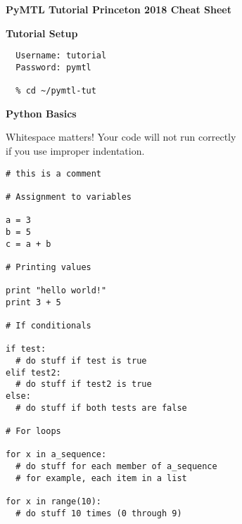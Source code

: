 \documentclass{cbxdoc}
\begin{document}
\pagestyle{empty}

\begin{landscape}
\small

\begin{center}
  \textbf{\Large PyMTL
    Tutorial  \hspace{0.5em}\textbullet\hspace{0.5em}
    Princeton 2018 \hspace{0.5em}\textbullet\hspace{0.5em}
    Cheat Sheet}
\end{center}

\begin{minipage}[t]{3.25in}
\vspace{0pt}

\colorbox{gray!30!white}{\parbox{1.025\tw}{\rule[-0.4em]{0pt}{1.4em}\centering\textbf{%
  Tutorial Setup%
}}}

\smallskip\smallskip
\begin{verbatim}
  Username: tutorial
  Password: pymtl

  % cd ~/pymtl-tut
\end{verbatim}

\vspace{0.15in}
\colorbox{gray!30!white}{\parbox{1.025\tw}{\rule[-0.4em]{0pt}{1.4em}\centering\textbf{%
  Python Basics%
}}}

\begin{center}
Whitespace matters! Your code will not run correctly \\ if you use
improper indentation.
\end{center}

\vspace{-0.1in}
\begin{lstlisting}
# this is a comment

# Assignment to variables

a = 3
b = 5
c = a + b

# Printing values

print "hello world!"
print 3 + 5

# If conditionals

if test:
  # do stuff if test is true
elif test2:
  # do stuff if test2 is true
else:
  # do stuff if both tests are false

# For loops

for x in a_sequence:
  # do stuff for each member of a_sequence
  # for example, each item in a list

for x in range(10):
  # do stuff 10 times (0 through 9)


\end{lstlisting}
\end{minipage}
\end{landscape}
\end{document}
